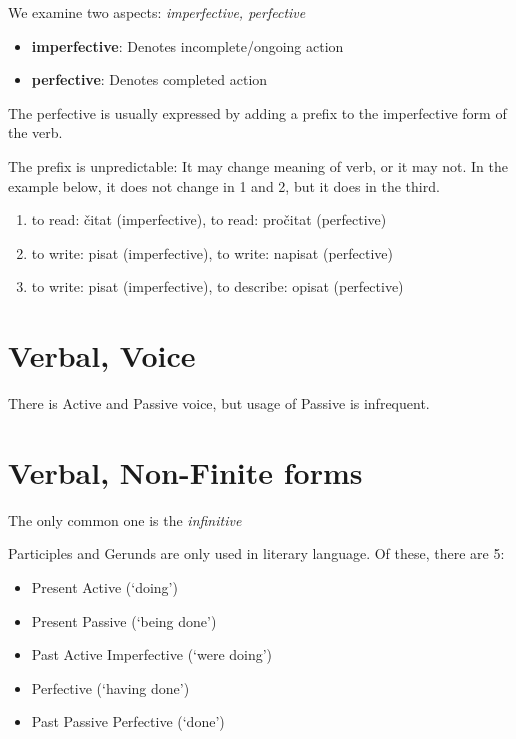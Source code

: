 \documentclass[
  a4paperpaper,
]{report}
\providecommand{\tightlist}{%
  \setlength{\itemsep}{0pt}\setlength{\parskip}{0pt}}
\begin{document}
We examine two aspects: \emph{imperfective, perfective}

\begin{itemize}
\tightlist
\item
  \textbf{imperfective}: Denotes incomplete/ongoing action
\item
  \textbf{perfective}: Denotes completed action
\end{itemize}

The perfective is usually expressed by adding a prefix to the
imperfective form of the verb.

The prefix is unpredictable: It may change meaning of verb, or it may
not. In the example below, it does not change in 1 and 2, but it does in
the third.

\begin{enumerate}
\def\labelenumi{\arabic{enumi}.}
\tightlist
\item
  to read: čitat (imperfective), to read: pročitat (perfective)
\item
  to write: pisat (imperfective), to write: napisat (perfective)
\item
  to write: pisat (imperfective), to describe: opisat (perfective)
\end{enumerate}

\hypertarget{verbal-voice}{%
\section{Verbal, Voice}\label{verbal-voice}}

There is Active and Passive voice, but usage of Passive is infrequent.

\hypertarget{verbal-non-finite-forms}{%
\section{Verbal, Non-Finite forms}\label{verbal-non-finite-forms}}

The only common one is the \emph{infinitive}

Participles and Gerunds are only used in literary language. Of these,
there are 5:

\begin{itemize}
\tightlist
\item
  Present Active (`doing')
\item
  Present Passive (`being done')
\item
  Past Active Imperfective (`were doing')
\item
  Perfective (`having done')
\item
  Past Passive Perfective (`done')
\end{itemize}
\end{document}

